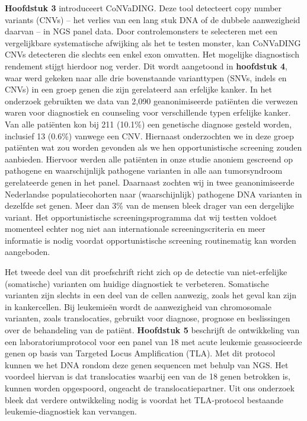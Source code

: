 \begin{appendices}
	\textbf{Hoofdstuk 3} introduceert CoNVaDING. Deze tool detecteert copy number variants (CNVs) – het verlies van een lang stuk DNA of de dubbele aanwezigheid daarvan – in NGS panel data. Door controlemonsters te selecteren met een vergelijkbare systematische afwijking als het te testen monster, kan CoNVaDING CNVs detecteren die slechts een enkel exon omvatten. Het mogelijke diagnostisch rendement stijgt hierdoor nog verder. Dit wordt aangetoond in \textbf{hoofdstuk 4}, waar werd gekeken naar alle drie bovenstaande varianttypen (SNVs, indels en CNVs) in een groep genen die zijn gerelateerd aan erfelijke kanker. In het onderzoek gebruikten we data van 2,090 geanonimiseerde patiënten die verwezen waren voor diagnostiek en counseling voor verschillende typen erfelijke kanker. Van alle patiënten kon bij 211 (10.1\%) een genetische diagnose gesteld worden, inclusief 13 (0.6\%) vanwege een CNV. Hiernaast onderzochten we in deze groep patiënten wat zou worden gevonden als we hen opportunistische screening zouden aanbieden. Hiervoor werden alle patiënten in onze studie anoniem gescreend op pathogene en waarschijnlijk pathogene varianten in alle aan tumorsyndroom gerelateerde genen in het panel. Daarnaast zochten wij in twee geanonimiseerde Nederlandse populatiecohorten naar (waarschijnlijk) pathogene DNA varianten in dezelfde set genen. Meer dan 3\% van de mensen bleek drager van een dergelijke variant. Het opportunistische screeningsprogramma dat wij testten voldoet momenteel echter nog niet aan internationale screeningscriteria en meer informatie is nodig voordat opportunistische screening routinematig kan worden aangeboden.
	
	Het tweede deel van dit proefschrift richt zich op de detectie van niet-erfelijke (somatische) varianten om huidige diagnostiek te verbeteren. Somatische varianten zijn slechts in een deel van de cellen aanwezig, zoals het geval kan zijn in kankercellen. Bij leukemieën wordt de aanwezigheid van chromosomale varianten, zoals translocaties, gebruikt voor diagnose, prognose en beslissingen over de behandeling van de patiënt. \textbf{Hoofdstuk 5} beschrijft de ontwikkeling van een laboratoriumprotocol voor een panel van 18 met acute leukemie geassocieerde genen op basis van Targeted Locus Amplification (TLA). Met dit protocol kunnen we het DNA rondom deze genen sequencen met behulp van NGS. Het voordeel hiervan is dat translocaties waarbij een van de 18 genen betrokken is, kunnen worden opgespoord, ongeacht de translocatiepartner. Uit ons onderzoek bleek dat verdere ontwikkeling nodig is voordat het TLA-protocol bestaande leukemie-diagnostiek kan vervangen. 
	

\end{appendices}
